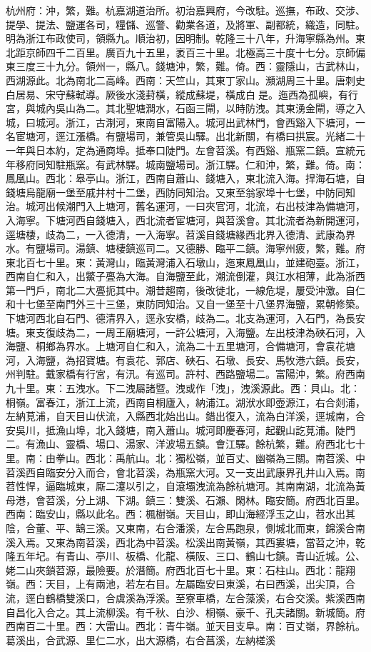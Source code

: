 \begin{pinyinscope}
杭州府：沖，繁，難。杭嘉湖道治所。初治嘉興府，今改駐。巡撫，布政、交涉、提學、提法、鹽運各司，糧儲、巡警、勸業各道，及將軍、副都統，織造，同駐。明為浙江布政使司，領縣九。順治初，因明制。乾隆三十八年，升海寧縣為州。東北距京師四千二百里。廣百九十五里，袤百三十里。北極高三十度十七分。京師偏東三度三十九分。領州一，縣八。錢塘沖，繁，難。倚。西：靈隱山，古武林山，西湖源此。北為南北二高峰。西南：天竺山，其東丁家山。瀕湖周三十里。唐刺史白居易、宋守蘇軾導。厥後水淺葑橫，縱成蘇堤，橫成白是。迤西為孤嶼，有行宮，與城內吳山為二。其北聖塘澗水，石函三閘，以時防洩。其東湧金閘，導之入城，曰城河。浙江，古淛河，東南自富陽入。城河出武林門，會西谿入下塘河，一名宦塘河，逕江漲橋。有鹽場司，兼管吳山驛。出北新關，有橋曰拱宸。光緒二十一年與日本約，定為通商埠。抵奉口陡門。左會苕溪。有西谿、瓶窯二鎮。宣統元年移府同知駐瓶窯。有武林驛。城南鹽場司。浙江驛。仁和沖，繁，難。倚。南：鳳凰山。西北：皋亭山。浙江，西南自蕭山、錢塘入，東北流入海。捍海石塘，自錢塘烏龍廟一堡至戚井村十二堡，西防同知治。又東至翁家埠十七堡，中防同知治。城河出候潮門入上塘河，舊名運河，一曰夾官河，北流，右出枝津為備塘河，入海寧。下塘河西自錢塘入，西北流者宦塘河，與苕溪會。其北流者為新開運河，逕塘棲，歧為二，一入德清，一入海寧。苕溪自錢塘緣西北界入德清、武康為界水。有鹽場司。湯鎮、塘棲鎮巡司二。又德勝、臨平二鎮。海寧州疲，繁，難。府東北百七十里。東：黃灣山，臨黃灣浦入石墩山，迤東鳳凰山，並建砲臺。浙江，西南自仁和入，出鱉子亹為大海。自海鹽至此，潮流倒灌，與江水相薄，此為浙西第一門戶，南北二大亹扼其中。潮昔趨南，後改徙北，一線危堤，屢受沖激。自仁和十七堡至南門外三十三堡，東防同知治。又自一堡至十八堡界海鹽，累朝修築。下塘河西北自石門、德清界入，逕永安橋，歧為二。北支為運河，入石門，為長安塘。東支復歧為二，一周王廟塘河，一許公塘河，入海鹽。左出枝津為硤石河，入海鹽、桐鄉為界水。上塘河自仁和入，流為二十五里塘河，合備塘河，會袁花塘河，入海鹽，為招寶塘。有袁花、郭店、硤石、石墩、長安、馬牧港六鎮。長安，州判駐。戴家橋有行宮，有汛。有巡司。許村、西路鹽場二。富陽沖，繁。府西南九十里。東：五洩水。下二洩屬諸暨。洩或作「洩」，洩溪源此。西：貝山。北：桐嶺。富春江，浙江上流，西南自桐廬入，納浦江。湖洑水即壺源江，右合剡浦，左納莧浦，自天目山伏流，入縣西北始出山。錯出復入，流為白洋溪，逕城南，合安吳川，抵漁山埠，北入錢塘，南入蕭山。城河即慶春河，起觀山訖莧浦。陡門二。有漁山、靈橋、場口、湯家、洋波場五鎮。會江驛。餘杭繁，難。府西北七十里。南：由拳山。西北：禹航山。北：獨松嶺，並百丈、幽嶺為三關。南苕溪、中苕溪西自臨安分入而合，會北苕溪，為瓶窯大河。又一支出武康界孔井山入焉。南苕性悍，逼臨城東，廝二瀽以引之，自滾壩洩流為餘杭塘河。其南南湖，北流為黃母港，會苕溪，分上湖、下湖。鎮三：雙溪、石瀨、閑林。臨安簡。府西北百里。西南：臨安山，縣以此名。西：楓樹嶺。天目山，即山海經浮玉之山，苕水出其陰，合董、平、鵠三溪。又東南，右合潘溪，左合馬跑泉，側城北而東，錦溪合南溪入焉。又東為南苕溪，西北為中苕溪。松溪出南黃嶺，其西婁塘，當苕之沖，乾隆五年圮。有青山、亭川、板橋、化龍、橫阪、三口、鶴山七鎮。青山近城。公、姥二山夾鎖苕源，最險要。於潛簡。府西北百七十里。東：石柱山。西北：龍翔嶺。西：天目，上有兩池，若左右目。左屬臨安曰東溪，右曰西溪，出尖頂，合流，逕白鶴橋雙溪口，合虞溪為浮溪。至寮車橋，左合藻溪，右合交溪。紫溪西南自昌化入合之。其上流柳溪。有千秋、白沙、桐嶺、豪千、孔夫諸關。新城簡。府西南百二十里。西：大雷山。西北：青牛嶺。並天目支阜。南：百丈嶺，界餘杭。葛溪出，合武源、里仁二水，出大源橋，右合菖溪，左納槎溪
\end{pinyinscope}
